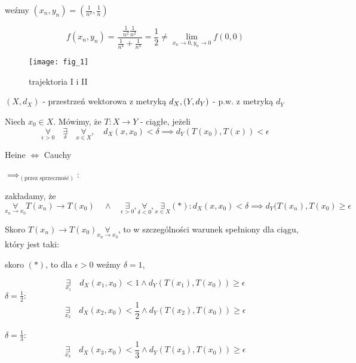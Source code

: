 \documentclass[../main.tex]{subfiles}
\begin{document}
weźmy $(x_{n},y_{n}) = (\frac{1}{n^{2}},\frac{1}{n})$

$$f(x_{n},y_{n}) = \frac{\frac{1}{n^{2}} \frac{1}{n^{2}}}{\frac{1}{n^{4}}+\frac{1}{n^{4}}} = \frac{1}{2} \neq \lim\limits_{x_{n}\to 0, y_{n}\to 0} f(0,0)$$

\begin{figure}
    \centering
    \begin{center}
        \texttt{[image: fig\_1]}
    \end{center}
    \caption{trajektoria I i II}
\end{figure}

$(X,d_{X})$ - przestrzeń wektorowa z metryką $d_{X},\\ (Y,d_{Y})$ - p.w. z metryką $d_{Y}$

Niech $x_{0}\in X$. Mówimy, że $T: X\to Y$ - ciągłe, jeżeli
$$\underset{\epsilon > 0}{\forall} \quad\underset{\delta}{\exists} \quad\underset{x\in X}{\forall}, \quad d_{X} (x,x_{0}) < \delta \implies d_{Y} (T(x_{0}), T(x)) < \epsilon$$

\begin{dowod}
    Heine $\iff$ Cauchy
\end{dowod}

\begin{large}
    $\implies_{(\text{przez sprzeczność})}$:
\end{large}
\vspace{0.5cm}

zakładamy, że $$\underset{x_n \to x_0}{\forall} T(x_{n}) \to T(x_{0}) \quad\land\quad \underset{\epsilon > 0}{\exists}, \underset{\delta < 0}{\forall}, \underset{x\in X}{\exists} (*): d_{X} (x,x_{0}) < \delta \implies d_{Y} (T(x_{n}),T(x_{0}) \geq \epsilon$$

Skoro $T(x_{n})\to T(x_{0}) \underset{x_n \to x_0}{\forall}$, to w szczególności warunek spełniony dla ciągu, który jest taki:

\vspace{0.3cm}
skoro $(*)$, to dla $\epsilon>0$ weźmy $\delta = 1$,

$$\underset{x_1}{\exists} \quad d_{X} (x_{1},x_{0})<1 \land d_{Y} (T(x_{1}), T(x_{0})) \geq \epsilon $$ $\delta=\frac{1}{2}:$
$$\underset{x_2}{\exists} \quad d_{X} (x_{2},x_{0})<\frac{1}{2} \land d_{Y} (T(x_{2}), T(x_{0})) \geq \epsilon $$\\ $\delta=\frac{1}{3}:$
$$\underset{x_3}{\exists} \quad d_{X} (x_{3},x_{0})<\frac{1}{3} \land d_{Y} (T(x_{3}), T(x_{0})) \geq \epsilon $$
\end{document}
